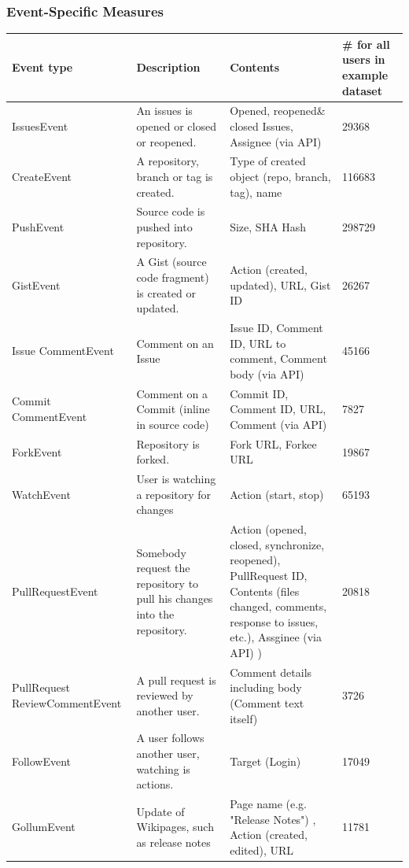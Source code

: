\documentclass[a4paper,10pt]{article}
\begin{document}
\subsubsection{Event-Specific Measures}
\begin{center}
 
\begin{tabular}{|p{2.5cm}|p{5cm}|p{6cm}|p{2cm}|}\hline
\textbf{Event type} & \textbf{Description}&  \textbf{Contents}& \textbf{\#  for all users in example dataset} \\\hline
 IssuesEvent  & An issues is opened or closed or reopened.   &  Opened, reopened\& closed Issues, Assignee (via API) &29368\\\hline
CreateEvent    &  A repository, branch or tag is created. & Type of created object (repo, branch, tag), name &  116683\\\hline
PushEvent  & Source code is pushed into repository. &  Size, SHA Hash &  298729\\\hline
GistEvent   &  A Gist (source code fragment) is created or updated.  &  Action (created, updated), URL, Gist ID &  26267\\\hline
Issue
CommentEvent &  Comment on an Issue  &  Issue ID, Comment ID, URL to comment, Comment body (via API)   &   45166\\\hline
Commit
CommentEvent &  Comment on a Commit (inline in source code) &  Commit ID, Comment ID, URL, Comment (via API) &  7827\\\hline
ForkEvent   &  Repository is forked.   & Fork URL, Forkee URL    & 19867\\\hline
WatchEvent  & User is watching a repository for changes &  Action (start, stop) &   65193\\\hline
PullRequestEvent     &  Somebody request the repository to pull his changes into the repository.  & Action (opened, closed, synchronize, reopened), PullRequest ID, Contents (files changed, comments, response to issues, etc.), Assginee (via API) ) &  20818\\\hline
PullRequest
ReviewCommentEvent  & A pull request is reviewed by another user. &  Comment details including body (Comment text itself) &  3726\\\hline
FollowEvent   &  A user follows another user, watching is actions.  & Target (Login)  & 17049\\\hline
GollumEvent  &  Update of Wikipages, such as release notes& Page name (e.g. "Release Notes") , Action (created, edited), URL  &  11781\\\hline

\end{tabular}
\end{center}
\end{document}
